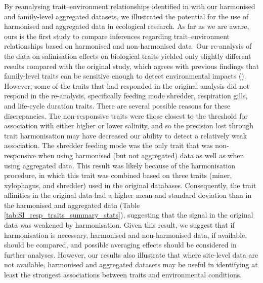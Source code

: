 \documentclass[12pt]{article}
\begin{document}
By reanalysing trait–environment relationships identified in \citet{szocs_effects_2014} with our harmonised and family-level aggregated datasets, we illustrated the potential for the use of harmonised and aggregated data in ecological research. As far as we are aware, ours is the first study to compare inferences regarding trait–environment relationships based on harmonised and non-harmonised data. Our re-analysis of the data on salinisation effects on biological traits yielded only slightly different results compared with the original study, which agrees with previous findings that family-level traits can be sensitive enough to detect environmental impacts (\cite{beketov_spear_2009}). However, some of the traits that had responded in the original analysis did not respond in the re-analysis, specifically feeding mode shredder, respiration gills, and life-cycle duration traits. There are several possible reasons for these discrepancies. The non-responsive traits were those closest to the threshold for association with either higher or lower salinity, and so the precision lost through trait harmonisation may have decreased our ability to detect a relatively weak association. The shredder feeding mode was the only trait that was non-responsive when using harmonised (but not aggregated) data as well as when using aggregated data. This result was likely because of the harmonisation procedure, in which this trait was combined based on three traits (miner, xylophagus, and shredder) used in the original databases. Consequently, the trait affinities in the original data had a higher mean and standard deviation than in the harmonised and aggregated data (Table \ref{tab:SI_resp_traits_summary_stats}), suggesting that the signal in the original data was weakened by harmonisation. Given this result, we suggest that if harmonisation is necessary, harmonised and non-harmonised data, if available, should be compared, and possible averaging effects should be considered in further analyses. However, our results also illustrate that where site-level data are not available, harmonised and aggregated datasets may be useful in identifying at least the strongest associations between traits and environmental conditions. 
\end{document}
